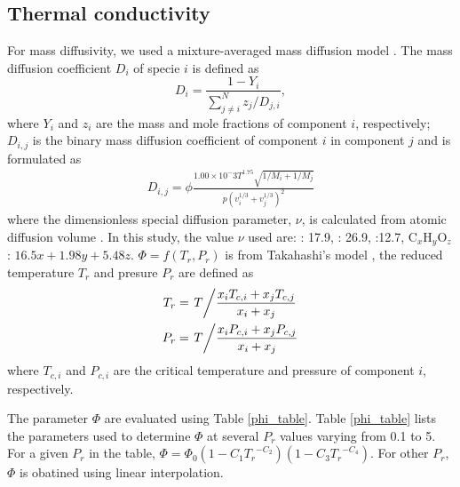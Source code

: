 \subsection{Thermal conductivity}
For mass diffusivity, we used a mixture-averaged mass diffusion model \cite{kee1996chemkin}. The mass diffusion coefficient $D_i$ of specie $i$ is defined as
\begin{equation}
	D_i=\frac{1-Y_i}{\sum^N_{j\neq i}z_j/D_{j,i}},\label{massdiff}
\end{equation}
where $Y_i$ and $z_i$ are the mass and mole fractions of component $i$, respectively; $D_{i,j}$ is the binary mass diffusion coefficient of component $i$ in component $j$ and is formulated as
\begin{align}
	D_{i,j} = \phi \frac{1.00\times 10^-3 T^{1.75}\sqrt{1/M_i+1/M_j}}{p\left(v_i^{1/3}+v_j^{1/3}\right)^2 }
\end{align}
where the dimensionless special diffusion parameter, $\nu$, is calculated from atomic diffusion volume \cite{fuller1966new}. In this study, the value $\nu$ used are: : 17.9, : 26.9, :12.7, $\text{C}_x\text{H}_y\text{O}_z$: $16.5x+1.98y+5.48z$. $\Phi=f(T_r,P_r)$ is from Takahashi’s model \cite{takahashi1975preparation}, the reduced temperature $T_r$ and presure $P_r$ are defined as
\begin{align}
	T_r & = \left. T \middle/\frac{x_i T_{c,i} +x_j T_{c,j}}{x_i+x_j} \right. \\
	P_r & = \left. T \middle/\frac{x_i P_{c,i} +x_j P_{c,j}}{x_i+x_j} \right. \\
\end{align}
where $T_{c,i}$ and $P_{c,i}$ are the critical temperature and pressure of component $i$, respectively.

The parameter $\Phi$ are evaluated using Table \ref{phi_table}. Table \ref{phi_table} lists the parameters used to determine $\Phi$ at several $P_r$ values varying from 0.1 to 5. For a given $P_r$ in the table, $\Phi= \Phi_0\left(1-C_1{T_r}^{-C_2}\right)\left(1-C_3{T_r}^{-C_4}\right)$. For other $P_r$, $\Phi$ is obatined using linear interpolation.

